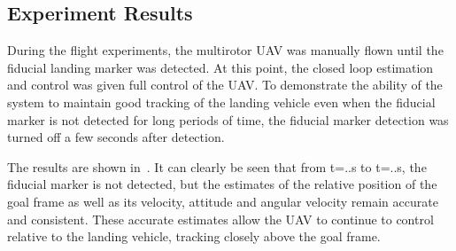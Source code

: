 
\subsection{Experiment Results}
During the flight experiments, the multirotor UAV was manually flown until the
fiducial landing marker was detected. At this point, the closed loop estimation
and control was given full control of the UAV. To demonstrate the ability of the
system to maintain good tracking of the landing vehicle even when the fiducial
marker is not detected for long periods of time, the fiducial marker detection
was turned off a few seconds after detection.

The results are shown in~. It can clearly be seen that from
t=..s to t=..s, the fiducial marker is not detected, but the estimates of the
relative position of the goal frame as well as its velocity, attitude and
angular velocity remain accurate and consistent. These accurate estimates allow
the UAV to continue to control relative to the landing vehicle, tracking closely
above the goal frame. 
